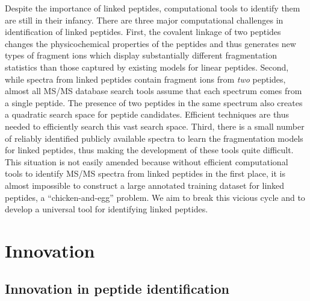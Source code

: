 Despite the importance of linked peptides, 
computational tools to identify them are still in their infancy.  There are three major computational challenges in  identification of linked peptides.
%
First, the covalent linkage of two peptides changes the physicochemical properties of the peptides and thus generates new types of fragment ions which display substantially different fragmentation statistics than those captured by existing models for linear peptides.
%
Second, while spectra from linked peptides contain fragment ions from \emph{two} peptides, almost all MS/MS database search tools 
 assume that each spectrum comes from a single peptide. The presence of two peptides in the same spectrum also creates a quadratic search space for peptide candidates.
Efficient techniques are thus needed to efficiently search this vast search space.
%
Third,  there is a small  number of reliably identified publicly available spectra to learn the fragmentation models for linked peptides, thus making the development of these tools quite difficult. This situation is not easily amended because without efficient computational tools to identify MS/MS spectra from linked peptides in the first place, it is almost impossible to construct a large annotated training dataset for linked peptides, a ``chicken-and-egg'' problem.  We aim to break this vicious cycle and to develop a universal tool for identifying linked peptides.


\section{Innovation} 

\subsection{Innovation in peptide identification} 

